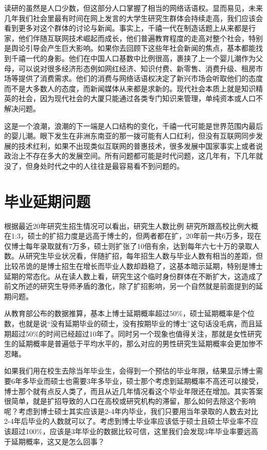 \documentclass[]{tufte-book}
\begin{document}
读研的虽然是人口少数，但这部分人口掌握了相当的网络话语权。显而易见，未来几年我们社会里最有时间在网上发言的大学生研究生群体会持续走高，我们应该会看到更多对这个群体的讨论与新闻。事实上，千禧一代在制造话题上从来都是行家，他们伴随互联网技术崛起而成长，他们普遍教育程度的走高对整个社会，特别是舆论引导会产生巨大影响。如果你去回顾下这些年社会新闻的焦点，基本都能找到千禧一代的身影。他们在中国人口基数中比例很高，裹挟了上一个婴儿潮作为父母，可以说对很多经济形态例如网红经济、知识付费、新零售、消费升级、租房市场等提供了消费需求。他们的消费与网络话语权决定了新兴市场会听取他们的态度而不是大多数人的态度，而新闻媒体从来都是求新的。现代社会本质上就是知识精英的社会，因为现代社会的大厦只能通过各类专门知识来管理，单纯资本或人口不解决问题。

这是一个浪潮，浪潮的下一端是人口结构的变化，千禧一代可能是世界范围内最后的婴儿潮。眼下发生在非洲东南亚的那一拨可能有人口红利，但没有互联网同步发展的技术红利，如果不出现类似互联网的普惠技术，很多发展中国家事实上或者说政治上不存在多大的发展空间。所有问题都可能是时代问题，这几年有，下几年就没了，但身处时代之中的人往往是最容易看不到问题的。

\hypertarget{ux6bd5ux4e1aux5ef6ux671fux95eeux9898}{%
\section{毕业延期问题}\label{ux6bd5ux4e1aux5ef6ux671fux95eeux9898}}

根据最近20年研究生招生情况可以看出，研究生人数比例 研究所跟高校比例大概在1:3，硕士的扩招力度是远高于博士的，但两者都在扩，20年前一共6万多，现在仅博士每年录取就有7万多，硕士则扩张了10倍有余，达到每年六七十万的录取人数。从研究生毕业状况看，伴随扩招，每年招生人数与毕业人数有相当的差距，但比较吊诡的是博士招生在增长而毕业人数却趋稳了，这基本暗示延期，特别是博士延期的常态化。从在读人数上看，研究生这个临时身份群体在不断扩大，这造成了前文所述的研究生导师矛盾的激化，除了扩招影响，另一个自然就是前面提到的延期问题。

从教育部公布的数据推算，基本上博士延期概率超过50\%，硕士延期概率是个位数，也就是说``没有延期毕业的硕士，没有按期毕业的博士''这句话没毛病，而且延期超过50\%的时间已经超过10年了。同时另一个现象也值得关注，那就是女性研究生的延期概率是普遍低于平均水平的，那么对应的男性研究生延期概率会更加惨不忍睹。

如果我们用在校生去除当年毕业生，会得到一个预估的毕业年限，结果显示博士需要6年多毕业而硕士也需要3年多毕业，硕士那个考虑到延期概率不高还可以接受，博士那个就有点反人类了，而且从近几年情况看这个毕业年限还在增加。其实答案很简单，就是扩招导致的人口在高校或研究机构的滞留，那么如何去除这个影响呢？考虑到博士硕士其实应该是2-4年内毕业，我们只要用当年录取的人数去对比2-4年后毕业的人数就可以了。考虑到博士毕业率应该低于硕士且硕士毕业率不应该超过100\%，应该是3年毕业的数据比较可信，这里我们会发现3年毕业率要远高于延期概率，这又是怎么回事？
\end{document}
